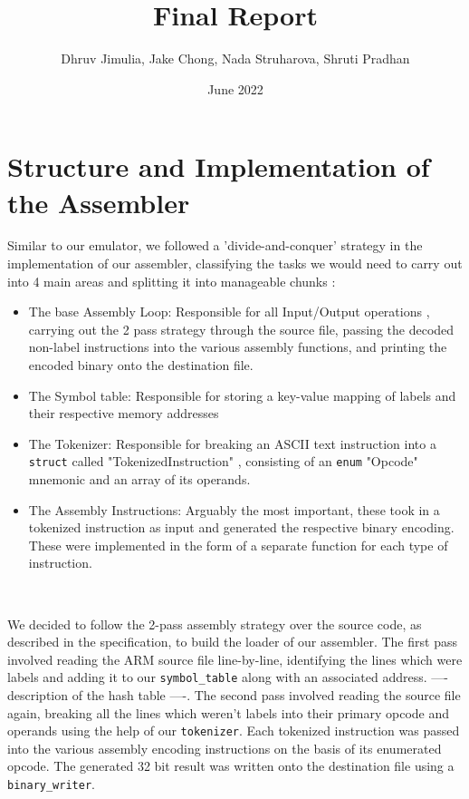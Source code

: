 \documentclass[11pt, letterpaper]{article}
\begin{document}
\title{Final Report}
\author{Dhruv Jimulia, Jake Chong, Nada Struharova, Shruti Pradhan}
\date{June 2022}


\maketitle

\section{Structure and Implementation of the Assembler}
Similar to our emulator, we followed a 'divide-and-conquer' strategy in the implementation of our assembler, classifying the tasks we would need to carry out into 4 main areas and splitting it into manageable chunks :
\begin{itemize}
    \item The base Assembly Loop: Responsible for all Input/Output operations , carrying out the 2 pass strategy through the source file, passing the decoded non-label instructions into the various assembly functions, and printing the encoded binary onto the destination file.
    \item The Symbol table: Responsible for storing a key-value mapping of labels and their respective memory addresses
    \item The Tokenizer: Responsible for breaking an ASCII text instruction into a \verb|struct| called "TokenizedInstruction" , consisting of an \verb|enum| "Opcode" mnemonic and an array of its operands.
    \item The Assembly Instructions: Arguably the most important, these took in a tokenized instruction as input and generated the respective binary encoding. These were implemented in the form of a separate function for each type of instruction.
\end{itemize}
\\ \newline

We decided to follow the 2-pass assembly strategy over the source code, as described in the specification, to build the loader of our assembler. The first pass involved reading the ARM source file line-by-line, identifying the lines which were labels and adding it to our \verb|symbol_table| along with an associated address. ---- description of the hash table ----.
The second pass involved reading the source file again, breaking all the lines which weren't labels into their primary opcode and operands using the help of our \verb|tokenizer|. Each tokenized instruction was passed into the various assembly encoding instructions on the basis of its enumerated opcode. The generated 32 bit result was written onto the destination file using a \verb|binary_writer|.
\\ \newline
\end{document}
